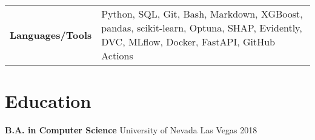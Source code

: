 \documentclass[a4paper,10pt]{article}
\begin{document}
\begin{tabular}{p{} p{}}
\textbf{Languages/Tools} & Python, SQL, Git, Bash, Markdown, XGBoost, pandas, scikit-learn, Optuna, SHAP, Evidently, DVC, MLflow, Docker, FastAPI, GitHub Actions \\
\end{tabular}


\section*{Education}

\textbf{B.A. in Computer Science} \hfill University of Nevada Las Vegas \hfill 2018
\end{document}
